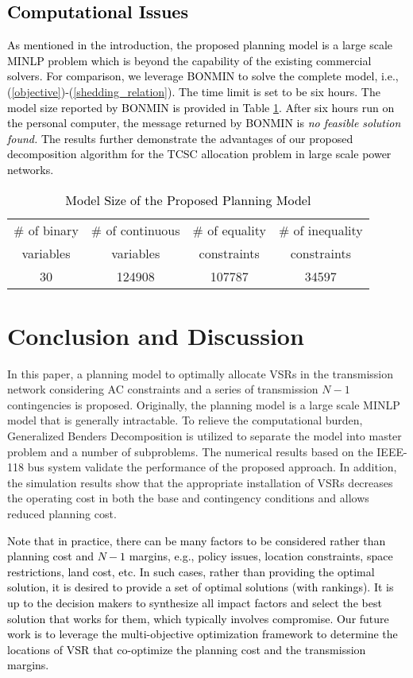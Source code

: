 \documentclass[journal]{IEEEtran}
\begin{document}
\subsection{\textcolor{black}{Computational Issues}}
\textcolor{black}{As mentioned in the introduction, the proposed planning model is a large scale MINLP problem which is beyond the capability of the existing commercial solvers. For comparison, we leverage BONMIN \cite{mybibb:bonmin} to solve the complete model, i.e., (\ref{objective})-(\ref{shedding_relation}). The time limit is set to be six hours. The model size reported by BONMIN is provided in Table \ref{model_size}. After six hours run on the personal computer, the message returned by BONMIN is \textsl{no feasible solution found.} The results further demonstrate the advantages of our proposed decomposition algorithm for the TCSC allocation problem in large scale power networks.}
\begin{table}[!htb]
	\centering
	\caption{\textcolor{black}{Model Size of the Proposed Planning Model}}
	\label{model_size}
	\begin{tabular}{c c c c}
		\hline
		\# of binary&\# of continuous&\# of equality&\# of inequality   \\
		variables&variables&constraints&constraints  \\
		\hline
		30&124908&107787&34597 \\
		\hline
		
		
	\end{tabular}
\end{table}

\section{Conclusion and Discussion}
\label{conclusions}
In this paper, a planning model to optimally allocate VSRs in the transmission network considering AC constraints and a series of transmission $N-1$ contingencies is proposed. Originally, the planning model is a large scale MINLP model that is generally intractable. To relieve the computational burden, Generalized Benders Decomposition is utilized to separate the model into master problem and a number of subproblems. The numerical results based on the IEEE-118 bus system validate the performance of the proposed approach. In addition, the simulation results show that the appropriate installation of VSRs decreases the operating cost in both the base and contingency conditions and allows reduced planning cost.

\textcolor{black}{Note that in practice, there can be many factors to be considered rather than planning cost and $N-1$ margins, e.g., policy issues, location constraints, space restrictions, land cost, etc. In such cases, rather than providing the optimal solution, it is desired to provide a set of optimal solutions (with rankings). It is up to the decision makers to synthesize all impact factors and select the best solution that works for them, which typically involves compromise. Our future work is to leverage the multi-objective optimization framework to determine the locations of VSR that co-optimize the planning cost and the transmission margins.}
\end{document}
